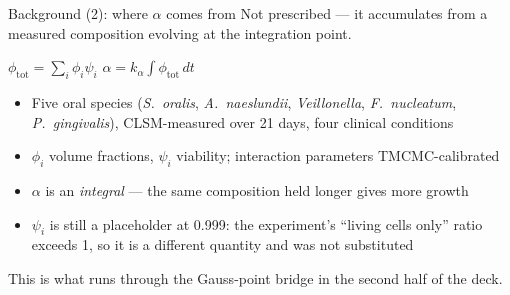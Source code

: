 \documentclass[aspectratio=169,11pt]{beamer}
\begin{document}
\begin{frame}{Background (2): where $\alpha$ comes from}
\small Not prescribed --- it accumulates from a measured composition evolving
at the integration point.
\vspace{4pt}
\begin{center}
\colorbox{c3!10}{\parbox{0.86\linewidth}{\centering\small
$\phi_{\text{tot}}=\sum_i \phi_i\psi_i$
\qquad
$\alpha = k_\alpha \displaystyle\int \phi_{\text{tot}}\,dt$}}
\end{center}
\vspace{4pt}
\begin{itemize}\footnotesize
  \item Five oral species (\textit{S.\ oralis}, \textit{A.\ naeslundii},
        \textit{Veillonella}, \textit{F.\ nucleatum}, \textit{P.\ gingivalis}),
        CLSM-measured over 21 days, four clinical conditions
  \item $\phi_i$ volume fractions, $\psi_i$ viability; interaction
        parameters TMCMC-calibrated
  \item $\alpha$ is an \emph{integral} --- the same composition held longer
        gives more growth
  \item $\psi_i$ is still a placeholder at 0.999: the experiment's
        ``living cells only'' ratio exceeds 1, so it is a different quantity
        and was not substituted
\end{itemize}
\vspace{3pt}
{\footnotesize This is what runs through the Gauss-point bridge in the
second half of the deck.}
\end{frame}
\end{document}
